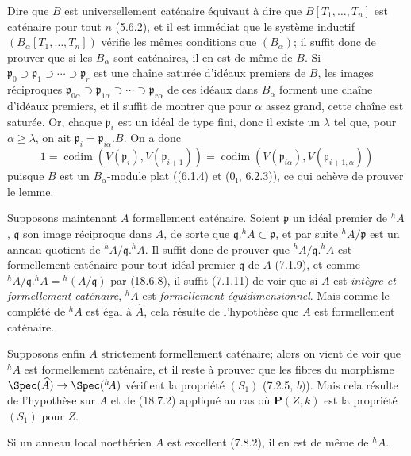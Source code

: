 Dire que $B$ est universellement caténaire équivaut à dire que $B[T_1,\ldots,T_n]$ est caténaire pour tout $n$ (5.6.2), et il est immédiat que le système inductif $(B_\alpha[T_1,\ldots,T_n])$ vérifie les mêmes conditions que $(B_\alpha)$; il suffit donc de prouver que si les $B_\alpha$ sont caténaires, il en est de même de $B$. Si $\mathfrak p_0\supset\mathfrak p_1\supset\cdots\supset\mathfrak p_r$ est une chaîne saturée d'idéaux premiers de $B$, les images réciproques $\mathfrak p_{0\alpha}\supset\mathfrak p_{1\alpha}\supset\cdots\supset\mathfrak p_{r\alpha}$ de ces idéaux dans $B_\alpha$ forment une chaîne d'idéaux premiers, et il suffit de montrer que pour $\alpha$ assez grand, cette chaîne est saturée. Or, chaque $\mathfrak p_i$ est un idéal de type fini, donc il existe un $\lambda$ tel que, pour $\alpha\geq\lambda$, on ait $\mathfrak p_i=\mathfrak p_{i\alpha}.B$. On a donc
\[
1=\operatorname{codim}(V(\mathfrak p_i),V(\mathfrak p_{i+1}))
=\operatorname{codim}(V(\mathfrak p_{i\alpha}),V(\mathfrak p_{i+1,\alpha}))
\]
puisque $B$ est un $B_\alpha$-module plat ((6.1.4) et ($0_{\mathrm I}$, 6.2.3)), ce qui achève de prouver le lemme.

Supposons maintenant $A$ formellement caténaire. Soient $\mathfrak p$ un idéal premier de ${}^h\!A$, $\mathfrak q$ son image réciproque dans $A$, de sorte que $\mathfrak q.{}^h\!A\subset\mathfrak p$, et par suite ${}^h\!A/\mathfrak p$ est un anneau quotient de ${}^h\!A/\mathfrak q.{}^h\!A$. Il suffit donc de prouver que ${}^h\!A/\mathfrak q.{}^h\!A$ est formellement caténaire pour tout idéal premier $\mathfrak q$ de $A$ (7.1.9), et comme ${}^h\!A/\mathfrak q.{}^h\!A={}^h(A/\mathfrak q)$ par (18.6.8), il suffit (7.1.11) de voir que si $A$ est \emph{intègre et formellement caténaire}, ${}^h\!A$ est \emph{formellement équidimensionnel}. Mais comme le complété de ${}^h\!A$ est égal à $\widehat A$, cela résulte de l'hypothèse que $A$ est formellement caténaire.


Supposons enfin $A$ strictement formellement caténaire; alors on vient de voir que ${}^h\!A$ est formellement caténaire, et il reste à prouver que les fibres du morphisme $\Spec(\widehat A)\to\Spec({}^h\!A)$ vérifient la propriété $(S_1)$ (7.2.5, $b)$). Mais cela résulte de l'hypothèse sur $A$ et de (18.7.2) appliqué au cas où $\mathbf P(Z,k)$ est la propriété $(S_1)$ pour $Z$.

\begin{corollary}[18.7.6]
\label{IV.18.7.6}
Si un anneau local noethérien $A$ est excellent (7.8.2), il en est de même de ${}^h\!A$.
\end{corollary}

